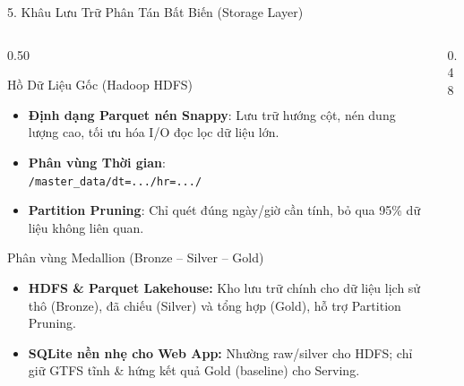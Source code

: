 \documentclass[aspectratio=169,10pt]{beamer}
\begin{document}
\begin{frame}{5. Khâu Lưu Trữ Phân Tán Bất Biến (Storage Layer)}
\begin{columns}[T]
    \begin{column}{0.50\textwidth}
        \begin{block}{Hồ Dữ Liệu Gốc (Hadoop HDFS)}
            \begin{itemize}\setlength{\itemsep}{2pt}\footnotesize
                \item \textbf{Định dạng Parquet nén Snappy}: Lưu trữ hướng cột, nén dung lượng cao, tối ưu hóa I/O đọc lọc dữ liệu lớn.
                \item \textbf{Phân vùng Thời gian}:\\
                \texttt{/master\_data/dt=.../hr=.../}
                \item \textbf{Partition Pruning}: Chỉ quét đúng ngày/giờ cần tính, bỏ qua 95\% dữ liệu không liên quan.
            \end{itemize}
        \end{block}
        \vspace{2pt}
        \begin{block}{Phân vùng Medallion (Bronze -- Silver -- Gold)}
            \begin{itemize}\setlength{\itemsep}{2pt}\footnotesize
                \item \textbf{HDFS \& Parquet Lakehouse:} Kho lưu trữ chính cho dữ liệu lịch sử thô (Bronze), đã chiếu (Silver) và tổng hợp (Gold), hỗ trợ Partition Pruning.
                \item \textbf{SQLite nền nhẹ cho Web App:} Nhường raw/silver cho HDFS; chỉ giữ GTFS tĩnh \& hứng kết quả Gold (baseline) cho Serving.
            \end{itemize}
        \end{block}
    \end{column}

    \begin{column}{0.48\textwidth}
        \centering
\end{column}
\end{columns}
\end{frame}
\end{document}
